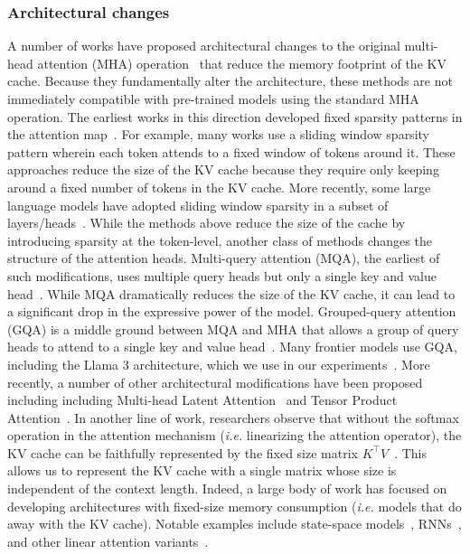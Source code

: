 \subsubsection{Architectural changes}
\label{app:related-work-reduce-arch}
A number of works have proposed architectural changes to the original multi-head attention (MHA) operation~\cite{vaswani2017attention} that reduce the memory footprint of the KV cache.
Because they fundamentally alter the architecture, these methods are not immediately compatible with pre-trained models using the standard MHA operation.
The earliest works in this direction developed fixed sparsity patterns in the attention map~\cite{beltagy2020longformer,child2019generating,zaheer2020big}. For example, many works use a sliding window sparsity pattern wherein each token attends to a fixed window of tokens around it. These approaches reduce the size of the KV cache because they require only keeping around a fixed number of tokens in the KV cache.
More recently, some large language models have adopted sliding window sparsity in a subset of layers/heads~\cite{team2024gemma}.
While the methods above reduce the size of the cache by introducing sparsity at the token-level, another class of methods changes the structure of the attention heads. Multi-query attention (MQA), the earliest of such modifications, uses multiple query heads but only a single key and value head~\cite{shazeer2019fast}.
While MQA dramatically reduces the size of the KV cache, it can lead to a significant drop in the expressive power of the model. Grouped-query attention (GQA) is a middle ground between MQA and MHA that allows a group of query heads to attend to a single key and value head~\cite{ainslie2023gqa}. Many frontier models use GQA, including the Llama 3 architecture, which we use in our experiments~\cite{dubey2024llama3,jiang2024identifying,yang2024qwen2}.
More recently, a number of other architectural modifications have been proposed including including Multi-head Latent Attention~\cite{liu2024deepseek} and Tensor Product Attention~\cite{zhang2025tensor}.
In another line of work, researchers observe that without the softmax operation in the attention mechanism (\textit{i.e.} linearizing the attention operator), the KV cache can be faithfully represented by the fixed size matrix $K^\top V$~\cite{arora2024simple}. This allows us to represent the KV cache with a single matrix whose size is independent of the context length.
Indeed, a large body of work has focused on developing architectures with fixed-size memory consumption (\textit{i.e.} models that do away with the KV cache). Notable examples include state-space models~\cite{gu2023mamba}, RNNs~\cite{beck2024xlstm}, and other linear attention variants~\cite{arora2024simple,yang2024parallelizing}.
